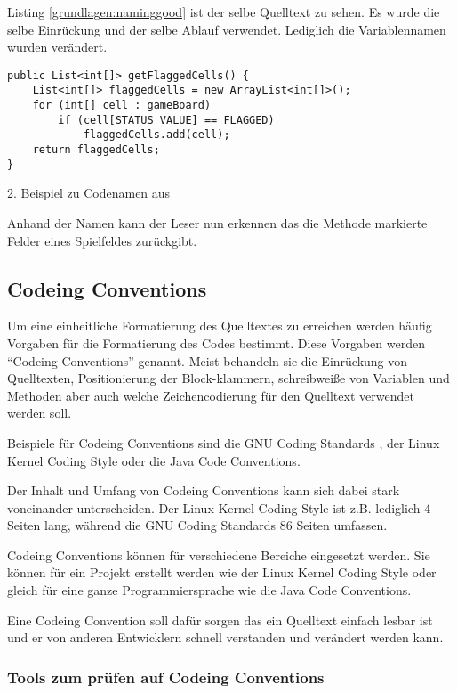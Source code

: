 Listing \ref{grundlagen:naminggood} ist der selbe Quelltext zu sehen.
Es wurde die selbe Einrückung und der selbe Ablauf verwendet. Lediglich
die Variablennamen wurden verändert.

\begin{listing}
    \begin{verbatim}
public List<int[]> getFlaggedCells() {
    List<int[]> flaggedCells = new ArrayList<int[]>();
    for (int[] cell : gameBoard)
        if (cell[STATUS_VALUE] == FLAGGED)
            flaggedCells.add(cell);
    return flaggedCells;
}
    \end{verbatim}
    \caption{2. Beispiel zu Codenamen aus \cite[S. 47]{Martin}}
    \label{grundlagen:naminggood}
\end{listing}

Anhand der Namen kann der Leser nun erkennen das die Methode markierte Felder eines Spielfeldes zurückgibt.

\subsection{Codeing Conventions}

Um eine einheitliche Formatierung des Quelltextes zu erreichen werden häufig
Vorgaben für die Formatierung des Codes bestimmt. Diese Vorgaben werden
\enquote{Codeing Conventions} genannt. Meist behandeln sie die Einrückung von Quelltexten,
Positionierung der Block-klammern, schreibweiße von Variablen und Methoden aber auch
welche Zeichencodierung für den Quelltext verwendet werden soll.

Beispiele für Codeing Conventions sind die GNU Coding Standards \cite{GNUCode},
der Linux Kernel Coding Style\cite{KernelCode} oder die Java Code Conventions\cite{javacode}.

Der Inhalt und Umfang von Codeing Conventions kann sich dabei stark voneinander
unterscheiden. Der Linux Kernel Coding Style ist z.B. lediglich 4 Seiten lang,
während die GNU Coding Standards 86 Seiten umfassen.

Codeing Conventions können für verschiedene Bereiche eingesetzt werden. Sie können für
ein Projekt erstellt werden wie der Linux Kernel Coding Style oder gleich für eine
ganze Programmiersprache wie die Java Code Conventions.

Eine Codeing Convention soll dafür sorgen das ein Quelltext einfach lesbar ist
und er von anderen Entwicklern schnell verstanden und verändert werden kann.

\subsubsection{Tools zum prüfen auf Codeing Conventions}

